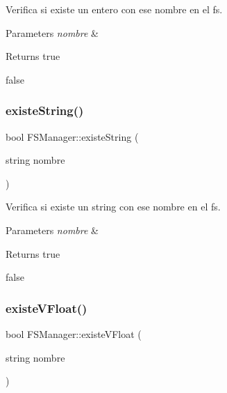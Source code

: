 Verifica si existe un entero con ese nombre en el fs. 


\begin{DoxyParams}{Parameters}
{\em nombre} & \\
\hline
\end{DoxyParams}
\begin{DoxyReturn}{Returns}
true 

false 
\end{DoxyReturn}
\mbox{\label{classFSManager_a0756a23591bc8fcd3c40a58af9881d34}} 
\subsubsection{\texorpdfstring{existe\+String()}{existeString()}}
{\footnotesize\ttfamily bool F\+S\+Manager\+::existe\+String (\begin{DoxyParamCaption}\item[{string}]{nombre }\end{DoxyParamCaption})\hspace{0.3cm}{\ttfamily [inline]}}



Verifica si existe un string con ese nombre en el fs. 


\begin{DoxyParams}{Parameters}
{\em nombre} & \\
\hline
\end{DoxyParams}
\begin{DoxyReturn}{Returns}
true 

false 
\end{DoxyReturn}
\mbox{\label{classFSManager_a63759864d11b386395f462a7876c2e89}} 
\subsubsection{\texorpdfstring{existe\+V\+Float()}{existeVFloat()}}
{\footnotesize\ttfamily bool F\+S\+Manager\+::existe\+V\+Float (\begin{DoxyParamCaption}\item[{string}]{nombre }\end{DoxyParamCaption})\hspace{0.3cm}{\ttfamily [inline]}}



